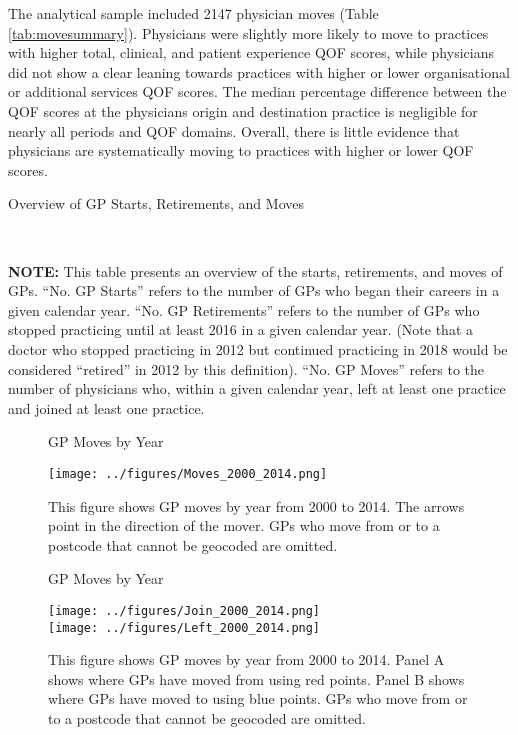 \documentclass[11pt]{article}
\begin{document}
The analytical sample included 2147 physician moves (Table \ref{tab:movesummary}). Physicians were slightly more likely to move to practices with higher total, clinical, and patient experience QOF scores, while physicians did not show a clear leaning towards practices with higher or lower organisational or additional services QOF scores. The median percentage difference between the QOF scores at the physicians origin and destination practice is negligible for nearly all periods and QOF domains. Overall, there is little evidence that physicians are systematically moving to practices with higher or lower QOF scores.


\begin{table}[htbp]
  \caption{Overview of GP Starts, Retirements, and Moves}
  \begin{threeparttable}
  \\
  \begin{tablenotes}
  \footnotesize
  \textbf{NOTE:} This table presents an overview of the starts, retirements, and moves of GPs. ``No. GP Starts'' refers to the number of GPs who began their careers in a given calendar year. ``No. GP Retirements'' refers to the number of GPs who stopped practicing until at least 2016 in a given calendar year. (Note that a doctor who stopped practicing in 2012 but continued practicing in 2018 would be considered ``retired'' in 2012 by this definition). ``No. GP Moves'' refers to the number of physicians who, within a given calendar year, left at least one practice and joined at least one practice.
  \end{tablenotes}
  \end{threeparttable}
  \label{tab:startsretirementoverview}
\end{table}


\begin{figure}[htp]
\centering
\caption{GP Moves by Year}
\texttt{[image: ../figures/Moves\_2000\_2014.png]}\\

\caption*{\footnotesize This figure shows GP moves by year from 2000 to 2014. The arrows point in the direction of the mover. GPs who move from or to a postcode that cannot be geocoded are omitted.}
\label{fig:Moves_2000_2014}
\end{figure}


\begin{figure}[htp]
\centering
\caption{GP Moves by Year}
\texttt{[image: ../figures/Join\_2000\_2014.png]}\\
\texttt{[image: ../figures/Left\_2000\_2014.png]}\\
\caption*{\footnotesize This figure shows GP moves by year from 2000 to 2014. Panel A shows where GPs have moved from using red points. Panel B shows where GPs have moved to using blue points. GPs who move from or to a postcode that cannot be geocoded are omitted.}
\label{fig:Join_Left_2000_2014}
\end{figure}
\end{document}
